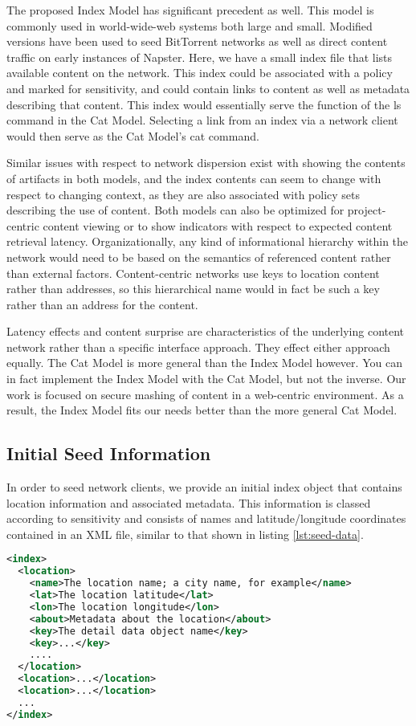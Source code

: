The proposed Index Model has significant precedent as well.  This model is commonly used in world-wide-web systems both large and small.  Modified versions have been used to seed BitTorrent networks as well as direct content traffic on early instances of Napster.  Here, we have a small index file that lists available content on the network.  This index could be associated with a policy and marked for sensitivity, and could contain links to content as well as metadata describing that content.  This index would essentially serve the function of the ls command in the Cat Model.  Selecting a link from an index via a network client would then serve as the Cat Model's cat command.

Similar issues with respect to network dispersion exist with showing the contents of artifacts in both models, and the index contents can seem to change with respect to changing context, as they are also associated with policy sets describing the use of content.  Both models can also be optimized for project-centric content viewing or to show indicators with respect to expected content retrieval latency.  Organizationally, any kind of informational hierarchy within the network would need to be based on the semantics of referenced content rather than external factors.  Content-centric networks use keys to location content rather than addresses, so this hierarchical name would in fact be such a key rather than an address for the content.

Latency effects and content surprise are characteristics of the underlying content network rather than a specific interface approach.  They effect either approach equally.  The Cat Model is more general than the Index Model however.  You can in fact implement the Index Model with the Cat Model, but not the inverse.  Our work is focused on secure mashing of content in a web-centric environment.  As a result, the Index Model fits our needs better than the more general Cat Model.

\subsection{Initial Seed Information}
In order to seed network clients, we provide an initial index object that contains location information and associated metadata.  This information is classed according to sensitivity and consists of names and latitude/longitude coordinates contained in an XML file, similar to that shown in listing \ref{lst:seed-data}.

\begin{lstlisting}[language=xml, label=lst:seed-data, caption=Seed Information for the Network]
<index>
  <location>
    <name>The location name; a city name, for example</name>
    <lat>The location latitude</lat>
    <lon>The location longitude</lon>
    <about>Metadata about the location</about>
    <key>The detail data object name</key>
    <key>...</key>
    ....
  </location>
  <location>...</location>
  <location>...</location>
  ...
</index>
\end{lstlisting}

